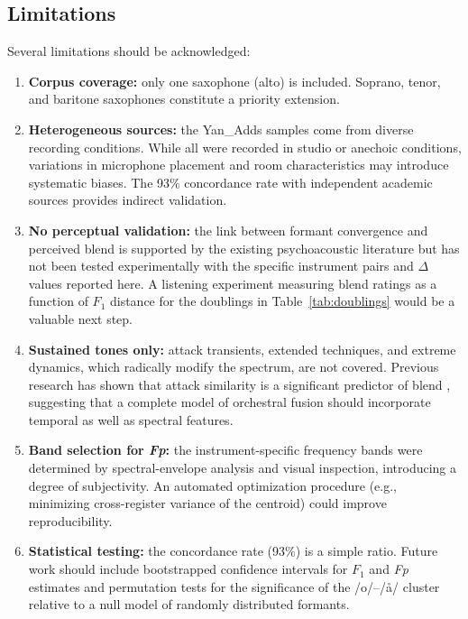 \documentclass[12pt,a4paper]{article}
\begin{document}
\subsection{Limitations}

Several limitations should be acknowledged:

\begin{enumerate}
\item \textbf{Corpus coverage:} only one saxophone (alto) is included. Soprano,
tenor, and baritone saxophones constitute a priority extension.

\item \textbf{Heterogeneous sources:} the Yan\_Adds samples come from diverse
recording conditions. While all were recorded in studio or anechoic conditions,
variations in microphone placement and room characteristics may introduce
systematic biases. The 93\% concordance rate with independent academic
sources provides indirect validation.

\item \textbf{No perceptual validation:} the link between formant convergence
and perceived blend is supported by the existing psychoacoustic literature
\citep{Sandell1995,Lembke2017} but has not been tested experimentally with
the specific instrument pairs and $\Delta$ values reported here. A listening
experiment measuring blend ratings as a function of $F_1$ distance for the
doublings in Table~\ref{tab:doublings} would be a valuable next step.

\item \textbf{Sustained tones only:} attack transients, extended techniques, and
extreme dynamics, which radically modify the spectrum, are not covered.
Previous research has shown that attack similarity is a significant predictor
of blend \citep{Sandell1995}, suggesting that a complete model of orchestral
fusion should incorporate temporal as well as spectral features.

\item \textbf{Band selection for \textit{Fp}:} the instrument-specific
frequency bands were determined by spectral-envelope analysis and visual
inspection, introducing a degree of subjectivity. An automated optimization
procedure (e.g., minimizing cross-register variance of the centroid) could
improve reproducibility.

\item \textbf{Statistical testing:} the concordance rate (93\%) is a simple
ratio. Future work should include bootstrapped confidence intervals for
$F_1$ and \textit{Fp} estimates and permutation tests for the significance
of the /o/--/\aa/ cluster relative to a null model of randomly distributed
formants.
\end{enumerate}
\end{document}
